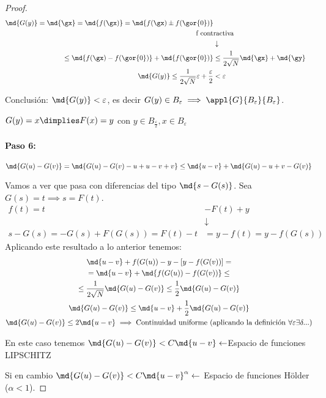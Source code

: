 \documentclass{apuntes}
\begin{document}
\begin{proof}
  \begin{align*}
\md{G(y)} = \md{\gx} = \md{f(\gx)} = \md{f(\gx) \pm f(\gor{0})}\\
  \text{f cont}&\text{ractiva}\\
  &\downarrow\\
\leq \md{f(\gx) - f(\gor{0})} + \md{f(\gor{0})} &\leq \frac{1}{2\sqrt{N}} \md{\gx} + \md{\gy} \\
\md{G(y)} \leq \frac{1}{2\sqrt{N}}\varepsilon + \frac{\varepsilon}{2} &< \varepsilon   
  \end{align*}
  
  Conclusión: $\md{G(y)} < \varepsilon$, es decir $G(y)\in B_{\varepsilon} \implies \appl{G}{B_\varepsilon}{B_\varepsilon}$.
  
  $G(y) = x \dimplies F(x) = y$ con $y\in B_{\frac{\varepsilon}{2}}, x \in B_{\varepsilon}$
  
  \paragraph{Paso 6:}
  
  $$\md{G(u)-G(v)} = \md{G(u)-G(v) -u +u-v+v} \leq \md{u-v} + \md{G(u)-u + v-G(v)}$$
  
  Vamos a ver que pasa con diferencias del tipo $\md{s -G(s)}$. Sea $G(s) = t \implies s = F(t)$.
  \begin{align*}
  f(t) = t &- F(t) + y\\
  &\downarrow\\
  s - G(s) = -G(s) + F(G(s)) = F(t)-t &= y-f(t) = y - f(G(s))
  \end{align*}
  Aplicando este resultado a lo anterior tenemos:
  \begin{gather*}
\md{u-v} + f(G(u)) - y - [y -f(G(v))] =\\
= \md{u-v} + \md{f(G(u)) - f(G(v))} \leq \\
\leq \frac{1}{2\sqrt{N}} \md{G(u)-G(v)} \leq \frac{1}{2}  \md{G(u)-G(v)}\\
\md{G(u)-G(v)}\leq \md{u-v} + \frac{1}{2}\md{G(u)-G(v)}\\
\md{G(u)-G(v)} \leq 2 \md{u-v} \implies \text{Continuidad uniforme (aplicando la definición } \forall \varepsilon \exists \delta ...)
  \end{gather*}
  
  En este caso tenemos $\md{G(u)-G(v)} < C\md{u-v} \leftarrow $Espacio de funciones LIPSCHITZ
  
  Si en cambio $\md{G(u)-G(v)} < C\md{u-v}^\alpha \leftarrow $ Espacio de funciones Hölder ($\alpha<1$).
  

\end{proof}
\end{document}

